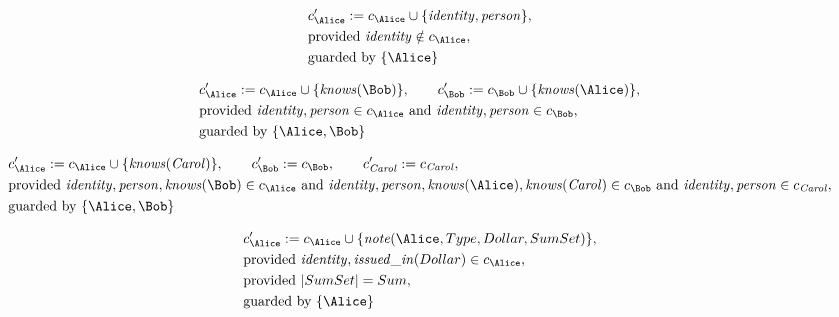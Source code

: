 \begin{align*}
&
c'_
{
\Alice
}
 := 
c_
{
\Alice
}
 \cup 
\{
\mathit{\detokenize{
identity
}}
,
\mathit{\detokenize{
person
}}
\}
,\\
&
\text{provided } 
\mathit{\detokenize{
identity
}}
 \notin c_
{
\Alice
}
,\\
&
\text{guarded by } \{
\Alice
\}
\end{align*}

\begin{align*}
&
c'_
{
\Alice
}
 := 
c_
{
\Alice
}
 \cup 
\{
\mathit{\detokenize{
knows
}}
(
\Bob
)
\}
, \qquad 
c'_
{
\Bob
}
 := 
c_
{
\Bob
}
 \cup 
\{
\mathit{\detokenize{
knows
}}
(
\Alice
)
\}
,\\
&
\text{provided } 
\mathit{\detokenize{
identity
}}
,
\mathit{\detokenize{
person
}}
 \in c_
{
\Alice
}
 \text{ and } 
\mathit{\detokenize{
identity
}}
,
\mathit{\detokenize{
person
}}
 \in c_
{
\Bob
}
,\\
&
\text{guarded by } \{
\Alice
,
\Bob
\}
\end{align*}

\begin{align*}
&
c'_
{
\Alice
}
 := 
c_
{
\Alice
}
 \cup 
\{
\mathit{\detokenize{
knows
}}
(
\mathit{Carol}
)
\}
, \qquad 
c'_
{
\Bob
}
 := 
c_
{
\Bob
}
, \qquad 
c'_
{
\mathit{Carol}
}
 := 
c_
{
\mathit{Carol}
}
,\\
&
\text{provided } 
\mathit{\detokenize{
identity
}}
,
\mathit{\detokenize{
person
}}
,
\mathit{\detokenize{
knows
}}
(
\Bob
)
 \in c_
{
\Alice
}
 \text{ and } 
\mathit{\detokenize{
identity
}}
,
\mathit{\detokenize{
person
}}
,
\mathit{\detokenize{
knows
}}
(
\Alice
)
,
\mathit{\detokenize{
knows
}}
(
\mathit{Carol}
)
 \in c_
{
\Bob
}
 \text{ and } 
\mathit{\detokenize{
identity
}}
,
\mathit{\detokenize{
person
}}
 \in c_
{
\mathit{Carol}
}
,\\
&
\text{guarded by } \{
\Alice
,
\Bob
\}
\end{align*}

\begin{align*}
&
c'_
{
\Alice
}
 := 
c_
{
\Alice
}
 \cup 
\{
\mathit{\detokenize{
note
}}
(
\Alice
,
Type
,
Dollar
,
SumSet
)
\}
,\\
&
\text{provided } 
\mathit{\detokenize{
identity
}}
,
\mathit{\detokenize{
issued_in
}}
(
Dollar
)
 \in c_
{
\Alice
}
,\\
&
\text{provided } 
|
SumSet
|
=
Sum
,\\
&
\text{guarded by } \{
\Alice
\}
\end{align*}

